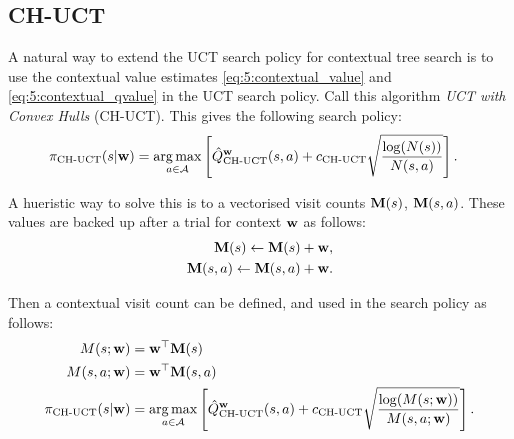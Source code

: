 



    \subsection{CH-UCT}
    \label{sec:5-3-2-chuct}







        A natural way to extend the UCT search policy for contextual tree search is to use the contextual value estimates \eqref{eq:5:contextual_value} and \eqref{eq:5:contextual_qvalue} in the UCT search policy. Call this algorithm \textit{UCT with Convex Hulls} (CH-UCT). This gives the following search policy:
        \begin{align}
            {\pi_{{\textnormal{CH-UCT}}}}(s|\mathbf{w}) &= \operatorname*{arg\,max}_{a\in\mathcal{A}} \left[
                {\hat{Q}^{\mathbf{w}}_{{\textnormal{CH-UCT}}}}(s,a) + {c_{{\textnormal{CH-UCT}}}} \sqrt{\frac{\log(N(s))}{N(s,a)}} \right].
        \end{align}

         A hueristic way to solve this is to a vectorised visit counts $\mathbf{M}(s)$, $\mathbf{M}(s,a)$. These values are backed up after a trial for context $\mathbf{w}$ as follows:
        \begin{align}
            \mathbf{M}(s) \leftarrow \mathbf{M}(s) + \mathbf{w}, \\
            \mathbf{M}(s,a) \leftarrow \mathbf{M}(s,a) + \mathbf{w}.
        \end{align}

        Then a contextual visit count can be defined, and used in the search policy as follows:
        \begin{align}
            M(s;\mathbf{w}) &= \mathbf{w}^\top \mathbf{M}(s) \\
            M(s,a;\mathbf{w}) &= \mathbf{w}^\top \mathbf{M}(s,a) \\
            {\pi_{{\textnormal{CH-UCT}}}}(s|\mathbf{w}) &= \operatorname*{arg\,max}_{a\in\mathcal{A}} \left[
                {\hat{Q}^{\mathbf{w}}_{{\textnormal{CH-UCT}}}}(s,a) + {c_{{\textnormal{CH-UCT}}}} \sqrt{\frac{\log(M(s;\mathbf{w}))}{M(s,a;\mathbf{w})}} \right].
        \end{align}

